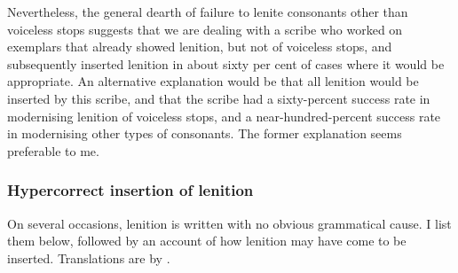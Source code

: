 Nevertheless, the general dearth of failure to lenite consonants other than voiceless stops suggests that we are dealing with a scribe who worked on exemplars that already showed lenition, but not of voiceless stops, and subsequently inserted lenition in about sixty per cent of cases where it would be appropriate. An alternative explanation would be that all lenition would be inserted by this scribe, and that the scribe had a sixty-percent success rate in modernising lenition of voiceless stops, and a near-hundred-percent success rate in modernising other types of consonants. The former explanation seems preferable to me.

\subsubsection{Hypercorrect insertion of lenition}
On several occasions, lenition is written with no obvious grammatical cause. I list them below, followed by an account of how lenition may have come to be inserted. Translations are by \textcite[\emph{passim}]{haycock_prophecies_2013}.


